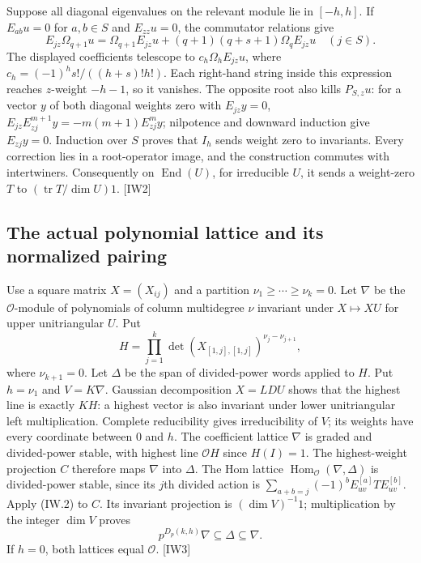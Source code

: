 \documentclass[11pt,a4paper]{article}
\numberwithin{equation}{section}
\theoremstyle{remark}\newtheorem{remark}[theorem]{Remark}
\begin{document}
Suppose all diagonal eigenvalues on the relevant module lie in $[-h,h]$.
If $E_{ab}u=0$ for $a,b\in S$ and $E_{zz}u=0$, the commutator relations give
\[
 E_{jz}\Omega_{q+1}u=\Omega_{q+1}E_{jz}u
 +(q+1)(q+s+1)\Omega_qE_{jz}u\quad(j\in S).
\]
The displayed coefficients telescope to $c_h\Omega_hE_{jz}u$, where $c_h=(-1)^hs!/((h+s)!h!)$.
Each right-hand string inside this expression reaches $z$-weight $-h-1$, so it vanishes.
The opposite root also kills $P_{S,z}u$: for a vector $y$ of both diagonal weights zero with $E_{jz}y=0$,
$E_{jz}E_{zj}^{m+1}y=-m(m+1)E_{zj}^my$; nilpotence and downward induction give $E_{zj}y=0$.
Induction over $S$ proves that $I_h$ sends weight zero to invariants.
Every correction lies in a root-operator image, and the construction commutes with intertwiners.
Consequently on $\operatorname{End}(U)$, for irreducible $U$, it sends a weight-zero $T$ to $(\operatorname{tr}T/\dim U)1$. \textsf{[IW2]}

\subsection{The actual polynomial lattice and its normalized pairing}

Use a square matrix $X=(X_{ij})$ and a partition $\nu_1\ge\cdots\ge\nu_k=0$.
Let $\nabla$ be the $\mathcal O$-module of polynomials of column multidegree $\nu$ invariant under $X\mapsto XU$ for upper unitriangular $U$. Put
\[
 H=\prod_{j=1}^{k}\det(X_{[1,j],[1,j]})^{\nu_j-\nu_{j+1}},
\]
where $\nu_{k+1}=0$. Let $\Delta$ be the span of divided-power words applied to $H$.
Put $h=\nu_1$ and $V=K\nabla$.
Gaussian decomposition $X=LDU$ shows that the highest line is exactly $KH$: a highest vector is also invariant under lower unitriangular left multiplication.
Complete reducibility gives irreducibility of $V$; its weights have every coordinate between $0$ and $h$.
The coefficient lattice $\nabla$ is graded and divided-power stable, with highest line $\mathcal OH$ since $H(I)=1$.
The highest-weight projection $C$ therefore maps $\nabla$ into $\Delta$.
The Hom lattice $\operatorname{Hom}_{\mathcal O}(\nabla,\Delta)$ is divided-power stable, since its $j$th divided action is
$\sum_{a+b=j}(-1)^b E_{uv}^{[a]}T E_{uv}^{[b]}$.
Apply (IW.2) to $C$. Its invariant projection is $(\dim V)^{-1}1$; multiplication by the integer $\dim V$ proves
\[
 p^{D_p(k,h)}\nabla\subseteq\Delta\subseteq\nabla. \tag{IW.3}
\]
If $h=0$, both lattices equal $\mathcal O$. \textsf{[IW3]}
\end{document}
